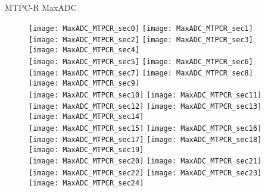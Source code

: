 \documentclass[11pt]{beamer}
\begin{document}
\begin{frame}{MTPC-R MaxADC}
\begin{figure}
\texttt{[image: MaxADC\_MTPCR\_sec0]}
\texttt{[image: MaxADC\_MTPCR\_sec1]}
\texttt{[image: MaxADC\_MTPCR\_sec2]}
\texttt{[image: MaxADC\_MTPCR\_sec3]}
\texttt{[image: MaxADC\_MTPCR\_sec4]}\\
\texttt{[image: MaxADC\_MTPCR\_sec5]}
\texttt{[image: MaxADC\_MTPCR\_sec6]}
\texttt{[image: MaxADC\_MTPCR\_sec7]}
\texttt{[image: MaxADC\_MTPCR\_sec8]}
\texttt{[image: MaxADC\_MTPCR\_sec9]}\\
\texttt{[image: MaxADC\_MTPCR\_sec10]}
\texttt{[image: MaxADC\_MTPCR\_sec11]}
\texttt{[image: MaxADC\_MTPCR\_sec12]}
\texttt{[image: MaxADC\_MTPCR\_sec13]}
\texttt{[image: MaxADC\_MTPCR\_sec14]}\\
\texttt{[image: MaxADC\_MTPCR\_sec15]}
\texttt{[image: MaxADC\_MTPCR\_sec16]}
\texttt{[image: MaxADC\_MTPCR\_sec17]}
\texttt{[image: MaxADC\_MTPCR\_sec18]}
\texttt{[image: MaxADC\_MTPCR\_sec19]}\\
\texttt{[image: MaxADC\_MTPCR\_sec20]}
\texttt{[image: MaxADC\_MTPCR\_sec21]}
\texttt{[image: MaxADC\_MTPCR\_sec22]}
\texttt{[image: MaxADC\_MTPCR\_sec23]}
\texttt{[image: MaxADC\_MTPCR\_sec24]}
\end{figure}
\end{frame}
\end{document}
